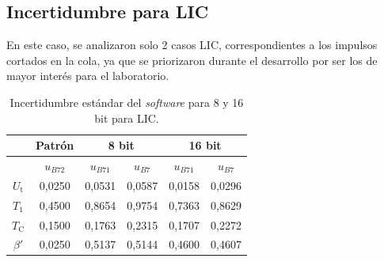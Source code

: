 \subsection*{Incertidumbre para LIC}
\label{subsec:incertidumbre_software_lic}

En este caso, se analizaron solo \num{2} casos LIC, correspondientes a los impulsos cortados en la cola, ya que se priorizaron durante el desarrollo por ser los de mayor interés para el laboratorio.

\vspace{3\baselineskip}
\begin{table}[H]
    \centering
    \begin{tabular}{@{}cccccc@{}}
        \toprule
                              & \textbf{Patrón}    & \multicolumn{2}{c}{\textbf{8 bit}}     & \multicolumn{2}{c}{\textbf{16 bit}}    \\ \midrule
                              & \textbf{$u_{B72}$} & \textbf{$u_{B71}$} & \textbf{$u_{B7}$} & \textbf{$u_{B71}$} & \textbf{$u_{B7}$} \\ \midrule
        \textbf{$U_\text{t}$} & 0,0250             & 0,0531             & 0,0587            & 0,0158             & 0,0296            \\ \midrule
        \textbf{$T_1$}        & 0,4500             & 0,8654             & 0,9754            & 0,7363             & 0,8629            \\ \midrule
        \textbf{$T_\text{C}$} & 0,1500             & 0,1763             & 0,2315            & 0,1707             & 0,2272            \\ \midrule
        \textbf{$\beta'$}     & 0,0250             & 0,5137             & 0,5144            & 0,4600             & 0,4607            \\ \bottomrule
        \end{tabular}
    \caption{Incertidumbre estándar del \emph{software} para 8 y 16 bit para LIC.}
    \label{tab:incertidumbre_software_lic}
\end{table}
\vspace{3\baselineskip}